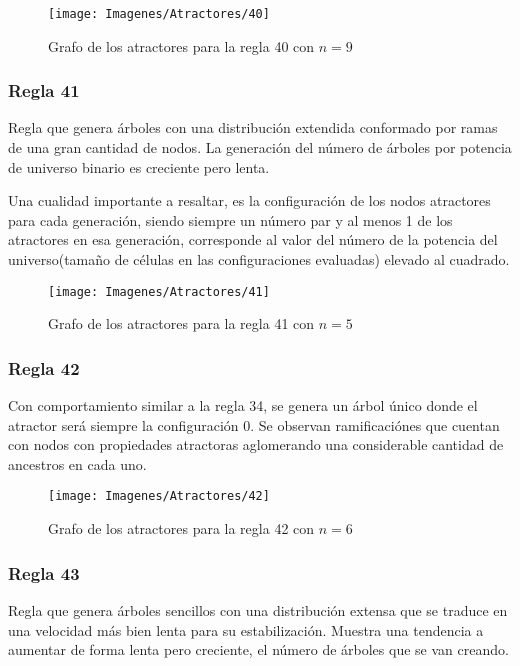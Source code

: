\documentclass[]{article}
\begin{document}
				\hfill\break
				\hfill\break
				\begin{figure}[!h]
					\centering
					\texttt{[image: Imagenes/Atractores/40]}
					\caption{Grafo de los atractores para la regla 40 con $n=9$}
					\label{Regla_40}
				\end{figure}
	
			
			\newpage
			\subsubsection{Regla 41}
				\justifying
				Regla que genera árboles con una distribución extendida conformado por ramas de una gran cantidad de nodos. La generación del número de árboles por potencia de universo binario es creciente pero lenta.
				
				\hfill\break
				\justifying
				Una cualidad importante a resaltar, es la configuración de los nodos atractores para cada generación, siendo siempre un número par y al menos 1 de los atractores en esa generación, corresponde al valor del número de la potencia del universo(tamaño de células en las configuraciones evaluadas) elevado al cuadrado.
				
				\hfill\break
				\hfill\break
				\begin{figure}[!h]
					\centering
					\texttt{[image: Imagenes/Atractores/41]}
					\caption{Grafo de los atractores para la regla 41 con $n=5$}
					\label{Regla_41}
				\end{figure}
				
			
			\newpage
			\subsubsection{Regla 42}
				\justifying
				Con comportamiento similar a la regla 34, se genera un árbol único donde el atractor será siempre la configuración 0. Se observan ramificaciónes que cuentan con nodos con propiedades atractoras aglomerando una considerable cantidad de ancestros en cada uno.
				
				\hfill\break
				\hfill\break
				\begin{figure}[!h]
					\centering
					\texttt{[image: Imagenes/Atractores/42]}
					\caption{Grafo de los atractores para la regla 42 con $n=6$}
					\label{Regla_42}
				\end{figure}
		
			
			\newpage
			\subsubsection{Regla 43}
				\justifying
				Regla que genera árboles sencillos con una distribución extensa que se traduce en una velocidad más bien lenta para su estabilización. Muestra una tendencia a aumentar de forma lenta pero creciente, el número de árboles que se van creando.
				
\end{document}
